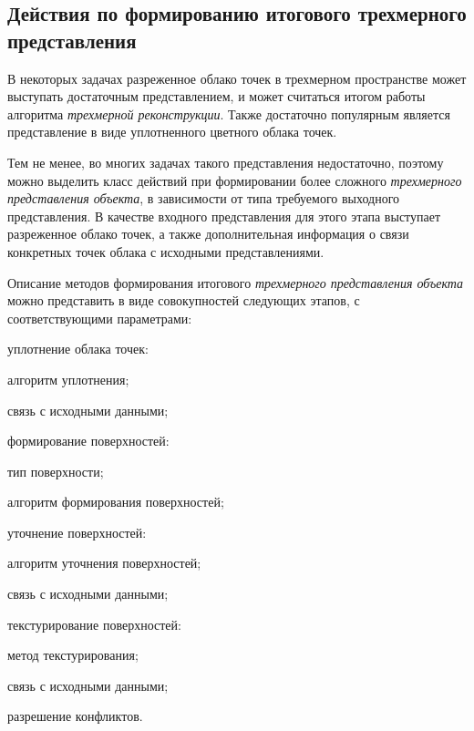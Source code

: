 \subsection{Действия по формированию итогового трехмерного представления}
\label{sec_3d_models_actions_final}

В некоторых задачах разреженное облако точек в трехмерном пространстве может выступать достаточным представлением, и может считаться итогом работы алгоритма \textit{трехмерной реконструкции}. Также достаточно популярным является представление в виде уплотненного цветного облака точек.

Тем не менее, во многих задачах такого представления недостаточно, поэтому можно выделить класс действий при формировании более сложного \textit{трехмерного представления объекта}, в зависимости от типа требуемого выходного представления. В качестве входного представления для этого этапа выступает разреженное облако точек, а также дополнительная информация о связи конкретных точек облака с исходными представлениями.

Описание методов формирования итогового \textit{трехмерного представления объекта} можно представить в виде совокупностей следующих этапов, с соответствующими параметрами:
\begin{textitemize}
    \item уплотнение облака точек:
    \begin{textitemize}
        \item алгоритм уплотнения;
        \item связь с исходными данными;
    \end{textitemize}
    \item формирование поверхностей:
    \begin{textitemize}
        \item тип поверхности;
        \item алгоритм формирования поверхностей;
    \end{textitemize}
    \item уточнение поверхностей:
    \begin{textitemize}
        \item алгоритм уточнения поверхностей;
        \item связь с исходными данными;
    \end{textitemize}
    \item текстурирование поверхностей:
    \begin{textitemize}
        \item метод текстурирования;
        \item связь с исходными данными;
        \item разрешение конфликтов.
    \end{textitemize}
\end{textitemize}

